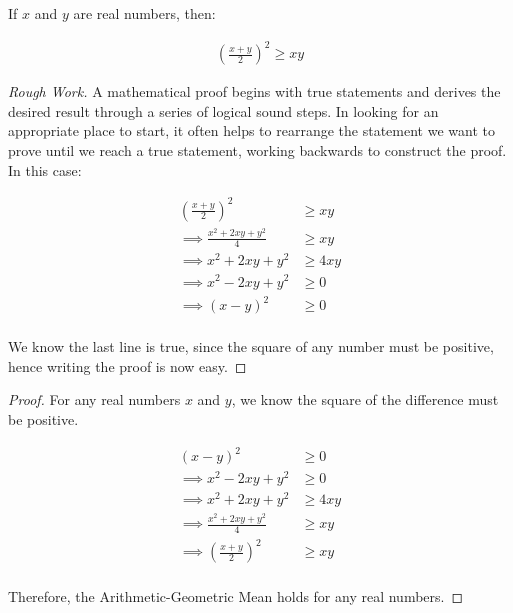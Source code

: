 \documentclass[twoside]{report}
\begin{document}
\begin{theorem} If $x$ and $y$ are real numbers, then:

\begin{align}
	\left( \frac{x + y}{2} \right)^2 \ge xy
\end{align}
	
\end{theorem}
\begin{proof}[Rough Work]\let\qed\relax
	A mathematical proof begins with true statements and derives the desired result through a series of logical sound steps. In looking for an appropriate place to start, it often helps to rearrange the statement we want to prove until we reach a true statement, working backwards to construct the proof. In this case:
	
	\begin{align*}
		\left( \frac{x + y}{2} \right)^2 &\ge xy \\
		\implies \frac{x^2 + 2xy + y^2}{4} &\ge xy \\
		\implies x^2 + 2xy + y^2 &\ge 4xy \\
		\implies x^2 - 2xy + y^2 &\ge 0 \\
		\implies (x - y)^2 &\ge 0\\
	\end{align*}
	
	We know the last line is true, since the square of any number must be positive, hence writing the proof is now easy.
\end{proof}
\vspace{\baselineskip}

\begin{proof}
	For any real numbers $x$ and $y$, we know the square of the difference must be positive.
	
	\begin{align*}
		(x - y)^2 &\ge 0 \\
		\implies x^2 - 2xy + y^2 &\ge 0 \\
		\implies x^2 + 2xy + y^2 &\ge 4xy \\
		\implies \frac{x^2 + 2xy + y^2}{4} &\ge xy \\
		\implies \left( \frac{x + y}{2} \right)^2 &\ge xy \\
	\end{align*}
	
	Therefore, the Arithmetic-Geometric Mean holds for any real numbers.
\end{proof}
\vspace{\baselineskip}
\end{document}
